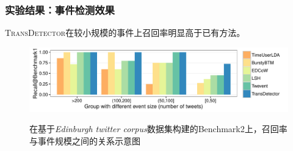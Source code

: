 \begin{frame}
\frametitle{\noindent 实验结果：事件检测效果}
\noindent \textsc{TransDetector}在较小规模的事件上召回率明显高于已有方法。
\vfill
\begin{figure}[h]
	\setlength{\abovecaptionskip}{0.cm}
	\setlength{\belowcaptionskip}{0.cm}
        \centering
        \caption{在基于\textit{Edinburgh twitter corpus}数据集构建的Benchmark2上，召回率与事件规模之间的关系示意图}
        \includegraphics[width=1.0\columnwidth]{img/barchartOnBenchmark1.pdf}
        \label{fig:Benchmark1}
\end{figure}
\end{frame}

